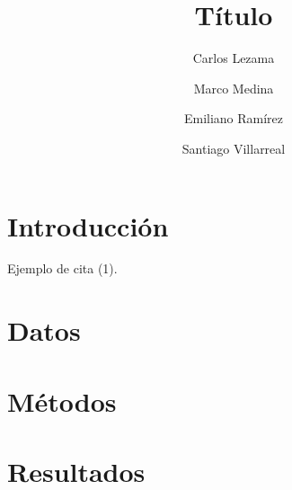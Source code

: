 \documentclass[9pt,twocolumn,twoside,]{pnas-new}
\title{Título}
\author[a,1,2]{Carlos Lezama}
\author[a,1,2]{Marco Medina}
\author[a,1,2]{Emiliano Ramírez}
\author[a,1,2]{Santiago Villarreal}
\affil[a]{Instituto Tecnológico Autónomo de México}
\begin{document}
\verticaladjustment{-2pt}

\maketitle
\thispagestyle{firststyle}


\acknow{}

\hypertarget{introducciuxf3n}{%
\section*{Introducción}\label{introducciuxf3n}}

Ejemplo de cita (1).

\lipsum[2-4]

\hypertarget{datos}{%
\section*{Datos}\label{datos}}

\lipsum[4-6]

\hypertarget{muxe9todos}{%
\section*{Métodos}\label{muxe9todos}}

\lipsum[6-8]

\hypertarget{resultados}{%
\section*{Resultados}\label{resultados}}
\end{document}

